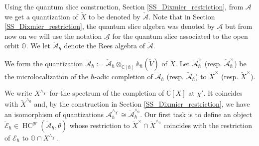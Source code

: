 \documentclass[12pt]{amsart}
\newcommand{\C}{\mathbb{C}}
\newcommand{\A}{\mathcal{A}}
\newcommand{\Orb}{\mathbb{O}}
\newcommand{\HC}{\operatorname{HC}}
\newcommand{\wHC}{\operatorname{wHC}}
\newcommand{\Weyl}{\mathbb{A}}
\newcommand{\Ecal}{\mathcal{E}}
\theoremstyle{definition}
\numberwithin{equation}{section}
\begin{document}
Using the quantum slice construction, Section \ref{SS_Dixmier_restriction}, from $\A$ we get a quantization
of $\check{X}$ to be denoted by $\check{\A}$. Note that in Section \ref{SS_Dixmier_restriction},
the quantum slice algebra was denoted by $\underline{\A}$ but from now on we will use the notation
$\underline{\A}$ for the quantum slice associated to the open orbit $\Orb$. We let $\check{\A}_\hbar$
denote the Rees algebra of $\check{\A}$.

We form the quantization
$\breve{\A}_\hbar:=\check{\A}_\hbar\otimes_{\C[\hbar]}\Weyl_\hbar(\check{V})$ of $\breve{X}$.
Let $\breve{\A}_\hbar^\times$ (resp. $\check{\A}_\hbar^\times$) be the microlocalization of the $\hbar$-adic completion of
$\breve{\A}_\hbar$ (resp. $\check{\A}_\hbar$) to $\breve{X}^\times$ (resp. $\check{X}^\times$).


We write $X^{\wedge_{\chi'}}$ for the spectrum of the completion of
$\C[X]$ at $\chi'$. It coincides with $\breve{X}^{\wedge_0}$ and, by the construction
in Section \ref{SS_Dixmier_restriction}, we have
an isomorphism of quantizations $\A_\hbar^{\wedge_{\chi'}}\cong
\breve{\A}_\hbar^{\wedge_0}$.
Our first task is to define an object $\breve{\Ecal}_\hbar\in \HC^{gr}(\breve{\A}_\hbar,\theta)$ %
whose restriction to $\breve{X}^\times\cap \breve{X}^{\wedge_0}$ coincides with
the restriction of $\Ecal_\hbar$ to $\Orb\cap X^{\wedge_{\chi'}}$.
\end{document}
